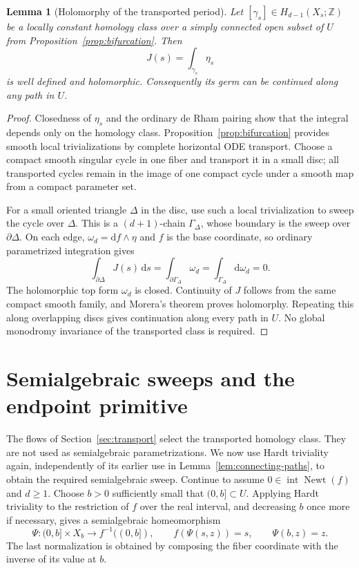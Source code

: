 \documentclass[11pt]{article}
\numberwithin{equation}{section}
\newtheorem{lemma}[theorem]{Lemma}
\theoremstyle{definition}
\theoremstyle{remark}
\newcommand{\Z}{\mathbb Z}
\newcommand{\Newt}{\operatorname{Newt}}
\newcommand{\Int}{\operatorname{int}}
\newcommand{\dd}{\mathrm d}
\newcommand{\omegaD}{\omega_d}
\begin{document}
\begin{lemma}[Holomorphy of the transported period]\label{lem:holomorphy}
Let $[\gamma_s]\in H_{d-1}(X_s;\Z)$ be a locally constant homology
class over a simply connected open subset of $U$ from
Proposition~\ref{prop:bifurcation}. Then
\[
 J(s)=\int_{\gamma_s}\eta_s
\]
is well defined and holomorphic. Consequently its germ can be continued
along any path in $U$.
\end{lemma}
\begin{proof}
Closedness of $\eta_s$ and the ordinary de Rham pairing show that the
integral depends only on the homology class.  Proposition~\ref{prop:bifurcation}
provides smooth local trivializations by complete horizontal ODE transport.
Choose a compact smooth singular cycle in one fiber and transport it in a
small disc; all transported cycles remain in the image of one compact
cycle under a smooth map from a compact parameter set.

For a small oriented triangle $\Delta$ in the disc, use such a local
trivialization to sweep the cycle over $\Delta$.  This is a
$(d+1)$-chain $\Gamma_\Delta$, whose boundary is the sweep over
$\partial\Delta$.  On each edge,
$\omegaD=\dd f\wedge\eta$ and $f$ is the base coordinate, so ordinary
parametrized integration gives
\[
 \int_{\partial\Delta}J(s)\,\dd s
 =\int_{\partial\Gamma_\Delta}\omegaD
 =\int_{\Gamma_\Delta}\dd\omegaD=0.
\]
The holomorphic top form $\omegaD$ is closed.  Continuity of $J$ follows
from the same compact smooth family, and Morera's theorem proves
holomorphy.  Repeating this along overlapping discs gives continuation
along every path in $U$.  No global monodromy invariance of the transported
class is required.
\end{proof}

\section{Semialgebraic sweeps and the endpoint primitive}\label{sec:primitive}
The flows of Section~\ref{sec:transport} select the transported homology
class. They are not used as semialgebraic parametrizations. We now use
Hardt triviality again, independently of its earlier use in
Lemma~\ref{lem:connecting-paths}, to obtain the required semialgebraic sweep.
Continue to assume $0\in\Int\Newt(f)$ and $d\ge1$. Choose $b>0$
sufficiently small that $(0,b]\subset U$. Applying Hardt triviality to
the restriction of $f$ over the real interval, and decreasing $b$ once
more if necessary, gives a semialgebraic homeomorphism
\begin{equation}\label{eq:hardt}
 \Psi:(0,b]\times X_b\longrightarrow f^{-1}((0,b]),
 \qquad f(\Psi(s,z))=s,\qquad\Psi(b,z)=z.
\end{equation}
The last normalization is obtained by composing the fiber coordinate
with the inverse of its value at $b$.
\end{document}
